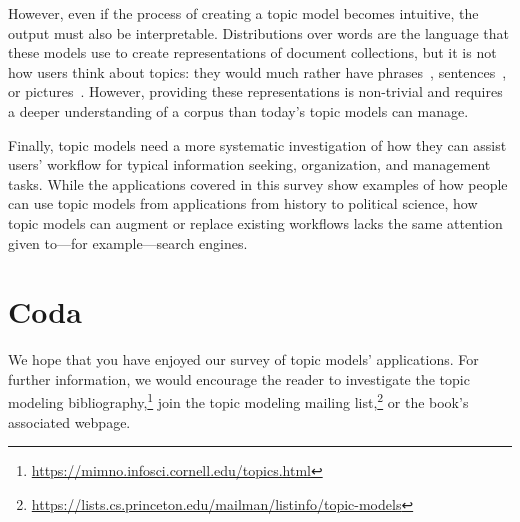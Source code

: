 However, even if the process of creating a topic model becomes
intuitive, the output must also be interpretable.  Distributions
over words are the language that these models use to create
representations of document collections, but it is not how users think
about topics: they would much rather have phrases~\citep{mei-07},
sentences~\citep{smith-16}, or pictures~\citep{lau-14}.  However,
providing these representations is non-trivial and requires a deeper
understanding of a corpus than today's topic models can manage.

Finally, topic models need a more systematic investigation of how
they can assist users' workflow for typical information seeking,
organization, and management tasks.  While the applications covered in
this survey show examples of how people can use topic models from
applications from history to political science, how topic models can
augment or replace existing workflows lacks the same attention given
to---for example---search engines.

\section{Coda}

We hope that you have enjoyed our survey of topic models'
applications.  For further information, we would encourage the reader to
investigate the topic modeling
bibliography,\footnote{\url{https://mimno.infosci.cornell.edu/topics.html}}
join the topic modeling mailing
list,\footnote{\url{https://lists.cs.princeton.edu/mailman/listinfo/topic-models}}
or the book's associated webpage.
